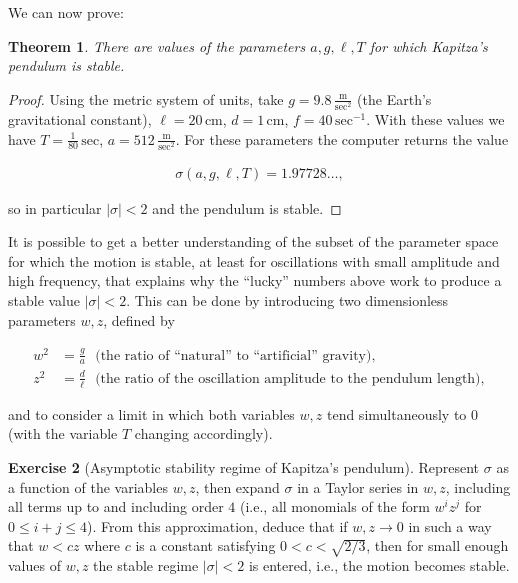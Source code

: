 \documentclass[11pt]{report}
\theoremstyle{plain}
\newtheorem{thm}{Theorem}[chapter]
\theoremstyle{definition}
\newtheorem{xexercise}[thm]{Exercise}
\begin{document}
We can now prove:

\begin{thm}
There are values of the parameters $a, g, \ell, T$
for which Kapitza's pendulum is stable.
\end{thm}

\begin{proof}
Using the metric system of units, take
$g=9.8\,\frac{\textrm{m}}{\textrm{sec}^2}$ (the
Earth's gravitational constant),
$\ell = 20\, \textrm{cm}$, $d=1\,\textrm{cm}$,
$f=40\,\textrm{sec}^{-1}$. With these values we have
$T=\frac{1}{80}\,\textrm{sec}$,
$a=512\,\frac{\textrm{m}}{\textrm{sec}^2}$. For these
parameters the computer returns the value

\begin{align*}
\sigma(a, g, \ell, T) = 1.97728\ldots,
\end{align*}

so in particular $|\sigma|<2$ and the pendulum is
stable.
\end{proof}

It is possible to get a better understanding of the
subset of the parameter space for which the motion is
stable, at least for oscillations with small amplitude
and high frequency, that explains why the ``lucky''
numbers above work to produce a stable value
$|\sigma|<2$. This can be done by introducing two
dimensionless parameters $w,z$, defined by

\begin{align*}
w^2 &= \frac{g}{a}\ \ \  \textrm{(the ratio of ``natural'' to ``artificial'' gravity)}, \\
z^2 &= \frac{d}{\ell}\ \ \  \textrm{(the ratio of the oscillation amplitude to the pendulum length)},
\end{align*}

and to consider a limit in which both variables $w,z$
tend simultaneously to $0$ (with the variable $T$
changing accordingly).

\begin{xexercise}[Asymptotic stability regime of Kapitza's pendulum]
Represent $\sigma$ as a function of the variables
$w, z$, then expand $\sigma$ in a Taylor series in
$w,z$, including all terms up to and including order
$4$ (i.e., all monomials of the form $w^i z^j$ for
$0\le i+j\le 4$). From this approximation, deduce
that if $w,z\to 0$ in such a way that $w<cz$ where $c$
is a constant satisfying $0<c<\sqrt{2/3}$, then for
small enough values of $w,z$ the stable regime
$|\sigma|<2$ is entered, i.e., the motion becomes
stable.
\end{xexercise}
\end{document}

